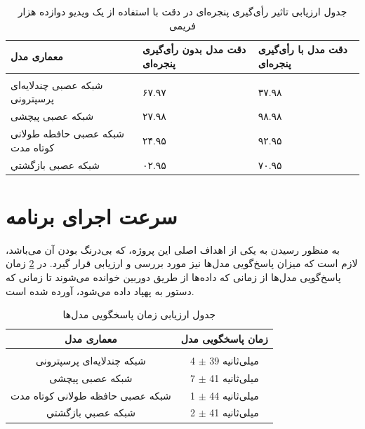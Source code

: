 \begin{table}[h!]
    \centering
    \begin{tabular}{||>{\centering\arraybackslash}p{5.5cm} >{\centering\arraybackslash}p{4cm} >{\centering\arraybackslash}p{4cm}||}
     \hline
     \rule{0pt}{3ex} معماری مدل & دقت مدل بدون رأی‌گیری پنجره‌ای & دقت مدل با رأی‌گیری پنجره‌ای \\ [1.5ex]
     \hline
     \hline
     \rule{0pt}{0.5ex} & & \\  
     شبکه عصبی چندلایه‌ای پرسپترونی & ۶۷.۹۷ \text{\%} & ۳۷.۹۸ \text{\%}\\ [2.5ex]
     شبکه عصبی پیچشی & ۲۷.۹۸ \text{\%} & ۹۸.۹۸ \text{\%} \\ [2.5ex]
     شبکه عصبی حافطه طولانی کوتاه مدت & ۲۴.۹۵ \text{\%} & ۹۲.۹۵ \text{\%} \\ [2.5ex]
     شبکه عصبی بازگشتي & ۰۲.۹۵ \text{\%} & ۷۰.۹۵ \text{\%} \\ [2.5ex]
     \hline
    \end{tabular}
    \caption{جدول ارزیابی تاثیر رأی‌گیری پنجره‌ای در دقت  با استفاده از یک ویدیو دوازده هزار فریمی}
    \centering
    \label{table:window}
\end{table}


\section{سرعت اجرای برنامه}
به منظور رسیدن به یکی از اهداف اصلی این پروژه، که بی‌درنگ بودن آن می‌باشد، لازم است که میزان پاسخ‌گویی مدل‌ها نیز مورد بررسی و ارزیابی قرار گیرد. در 
\cref{table:1}
زمان پاسخ‌گویی مدل‌ها از زمانی که داده‌ها از طریق دوربین خوانده می‌شوند تا زمانی که دستور به پهپاد داده می‌شود، آورده شده است.

\begin{table}[h!]
    \centering
    \begin{tabular}{||c c||}
     \hline
     \rule{0pt}{3ex}معماری مدل & زمان پاسخگویی مدل\\ [1.5ex]
     \hline
     \hline
     \rule{0pt}{0.5ex} & \\  %
     شبکه چندلایه‌ای پرسپترونی & 4 $\pm$ 39 میلی‌ثانیه \\ [2.5ex]
     شبکه عصبی پیچشی & 7 $\pm$ 41 میلی‌ثانیه  \\ [2.5ex]
     شبکه عصبی  حافظه طولانی کوتاه مدت & 1 $\pm$ 44 میلی‌ثانیه  \\ [2.5ex]
     شبكه عصبي بازگشتي & 2 $\pm$ 41 میلی‌ثانیه  \\ [2.5ex]

     \hline
    \end{tabular}
    \caption{جدول ارزیابی زمان پاسخگویی مدل‌ها}
    \label{table:1}
\end{table}


